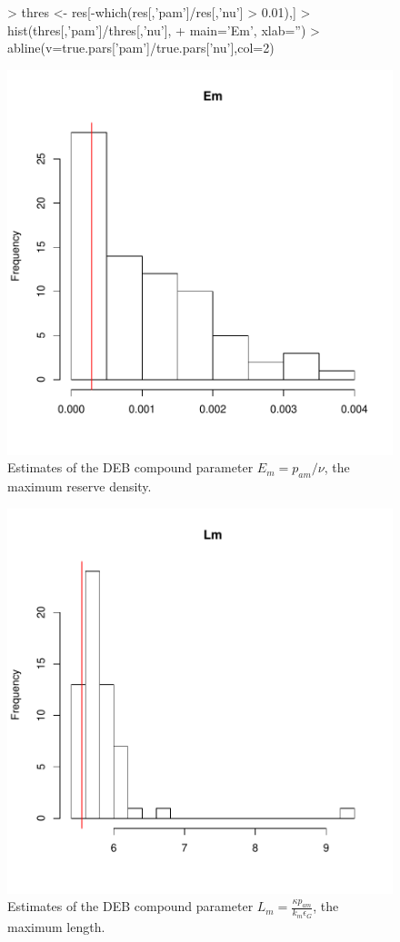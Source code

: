 \documentclass[12pt,reqno,final]{amsart}
\theoremstyle{plain}
\numberwithin{equation}{part}
\begin{document}
\begin{figure}
\begin{Schunk}
\begin{Sinput}
> thres <- res[-which(res[,'pam']/res[,'nu'] > 0.01),]
> hist(thres[,'pam']/thres[,'nu'],
+      main='Em', xlab='')
> abline(v=true.pars['pam']/true.pars['nu'],col=2)
\end{Sinput}
\end{Schunk}
\includegraphics{Solving_the_problem_of_parameter_covariation-011}
\caption{Estimates of the DEB compound parameter $E_m = p_{am}/\nu$,
  the maximum reserve density.}
\end{figure}

\begin{figure}
\includegraphics{Solving_the_problem_of_parameter_covariation-012}
\caption{Estimates of the DEB compound parameter $L_m = \frac{\kappa
    p_{am}}{k_m \epsilon_G}$, the maximum length.}
\end{figure}
\end{document}
